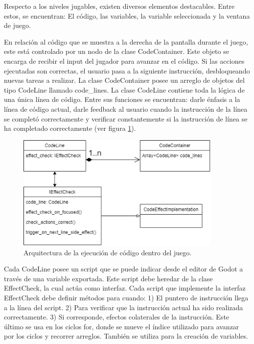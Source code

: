 Respecto a los niveles jugables, existen diversos elementos destacables. Entre estos, se encuentran: El código, las variables, la variable seleccionada y la ventana de juego.

En relación al código que se muestra a la derecha de la pantalla durante el juego, este está controlado por un nodo de la clase CodeContainer. Este objeto se encarga de recibir el input del jugador para avanzar en el código. Si las acciones ejecutadas son correctas, el usuario pasa a la siguiente instrucción, desbloqueando nuevas tareas a realizar. La clase CodeContainer posee un arreglo de objetos del tipo CodeLine llamado code\_lines. La clase CodeLine contiene toda la lógica de una única línea de código. Entre sus funciones se encuentran: darle énfasis a la línea de código actual, darle feedback al usuario cuando la instrucción de la línea se completó correctamente y verificar constantemente si la instrucción de línea se ha completado correctamente (ver figura \ref{CodeLinesArchitecture}).

\begin{figure}[h]
	\centering
	\includegraphics[width=0.9\textwidth]{imagenes/CodeLinesArchitecture.png}
	\caption{Arquitectura de la ejecución de código dentro del juego.}
	\label{CodeLinesArchitecture}
\end{figure}

Cada CodeLine posee un script que se puede indicar desde el editor de Godot a través de una variable exportada. Este script debe heredar de la clase EffectCheck, la cual actúa como interfaz. Cada script que implemente la interfaz EffectCheck debe definir métodos para cuando: 1) El puntero de instrucción llega a la línea del script. 2) Para verificar que la instrucción actual ha sido realizada correctamente. 3) Si corresponde, efectos colaterales de la instrucción. Este último se usa en los ciclos for, donde se mueve el índice utilizado para avanzar por los ciclos y recorrer arreglos. También se utiliza para la creación de variables.

